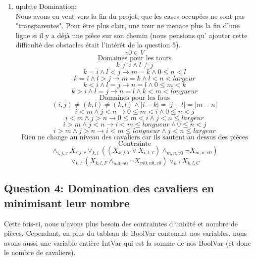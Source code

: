 \begin{enumerate}
    \item update Domination:\\
    Nous avons eu vent vers la fin du projet, que les cases occupées ne sont pas "transparentes". Pour être plus clair, une tour ne menace plus la fin d'une ligne si il y a déjà une pièce sur son chemin (nous pensions qu' ajouter cette difficulté des obstacles était l'intérêt de la question 5).\\
    \[ v0 \in V \]
    \[ \text{Domaines pour les tours} \]
    \[ k \neq i \land l \neq j\]
    \[ k = i \land l < j \longrightarrow  m=k \land 0 \leq n < l\]
    \[ k = i \land l > j \longrightarrow  m=k \land l < n < largeur  \]
    \[ k < i \land l = j \longrightarrow  n=l \land 0 \leq m < k\]
    \[ k > i \land l = j \longrightarrow  n=l \land k < m < longueur  \]
    \[ \text{Domaines pour les fous} \]
    \[ (i,j) \neq (k,l) \neq (k,l) \land |i-k| = |j-l| = |m-n| \]
    \[ i < m \land j < n \longrightarrow 0 \leq m < i \land 0 \leq n < j\]
    \[ i < m \land j > n \longrightarrow 0 \leq m < i \land j < n \leq largeur\]
    \[ i > m \land j < n \longrightarrow i < m \leq longueur \land 0 \leq n < j\]
    \[ i > m \land j > n \longrightarrow i < m \leq longueur \land j < n \leq largeur\]
    \[ \text{Rien ne change au niveau des cavaliers car ils sautent au dessus des pièces} \]
    \[ \text{Contrainte} \]
    \[  \land_{i,j,v} X_{i,j,v} \lor_{k,l} ( ( X_{k,j,T} \lor X_{i,l,T} ) \land_{m,n,v0} \neg X_{m,n,v0} ) \] 
    \[ \lor_{k,l} ( X_{k,l,F} \land_{m0,n0} \neg X_{m0,n0,v0} ) \lor_{k,l} X_{k,l,C} \]
\end{enumerate}



\subsection{Question 4: Domination des cavaliers en minimisant leur nombre}
Cette fois-ci, nous n'avons plus besoin des contraintes d'unicité et nombre de pièces. Cependant, en plus du tableau de BoolVar contenant nos variables, nous avons aussi une variable entière IntVar qui est la somme de nos BoolVar (et donc le nombre de cavaliers).

